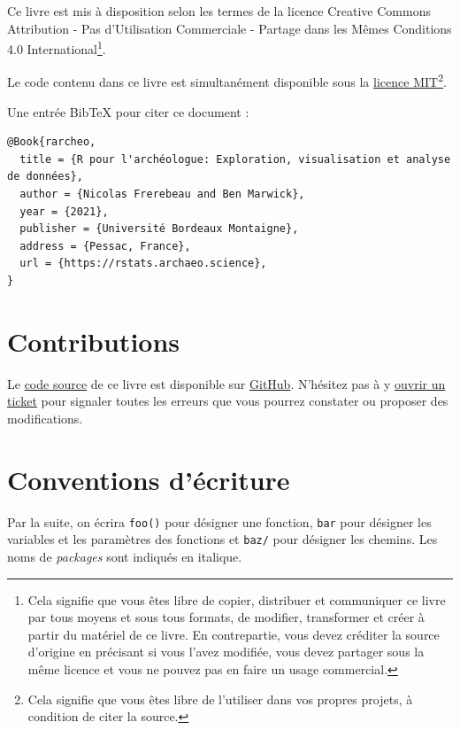 \documentclass[
  french,
]{scrbook}
\begin{document}
Ce livre est mis à disposition selon les termes de la licence Creative Commons Attribution - Pas d'Utilisation Commerciale - Partage dans les Mêmes Conditions 4.0 International\footnote{Cela signifie que vous êtes libre de copier, distribuer et communiquer ce livre par tous moyens et sous tous formats, de modifier, transformer et créer à partir du matériel de ce livre. En contrepartie, vous devez créditer la source d'origine en précisant si vous l'avez modifiée, vous devez partager sous la même licence et vous ne pouvez pas en faire un usage commercial.}.

Le code contenu dans ce livre est simultanément disponible sous la \href{https://opensource.org/licenses/MIT}{licence MIT}\footnote{Cela signifie que vous êtes libre de l'utiliser dans vos propres projets, à condition de citer la source.}.

Une entrée BibTeX pour citer ce document :

\begin{verbatim}
@Book{rarcheo,
  title = {R pour l'archéologue: Exploration, visualisation et analyse de données},
  author = {Nicolas Frerebeau and Ben Marwick},
  year = {2021},
  publisher = {Université Bordeaux Montaigne},
  address = {Pessac, France},
  url = {https://rstats.archaeo.science},
}
\end{verbatim}

\hypertarget{contributions}{%
\section*{Contributions}\label{contributions}}

Le \href{https://github.com/nfrerebeau/rarcheo}{code source} de ce livre est disponible sur \href{https://github.com/}{GitHub}. N'hésitez pas à y \href{https://github.com/nfrerebeau/rarcheo/issues}{ouvrir un ticket} pour signaler toutes les erreurs que vous pourrez constater ou proposer des modifications.

\hypertarget{conventions-duxe9criture}{%
\section*{Conventions d'écriture}\label{conventions-duxe9criture}}

Par la suite, on écrira \texttt{foo()} pour désigner une fonction, \texttt{bar} pour désigner les variables et les paramètres des fonctions et \texttt{baz/} pour désigner les chemins. Les noms de \emph{packages} sont indiqués en italique.
\end{document}
